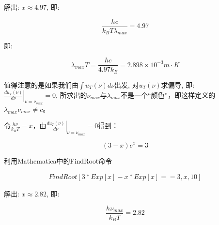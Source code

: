 \begin{enumerate}
解出: $x \approx 4.97$, 即:

\begin{equation}
\frac{hc}{k_B T \lambda_{max}} = 4.97~
\end{equation}

即:

\begin{equation}
    \lambda_{max} T =\frac{hc}{4.97 k_B} = 2.898 \times 10^{-3} m \cdot K~
\end{equation}

值得注意的是如果我们由$\int u_T(\nu) d \nu$出发, 对$u_T(\nu)$求偏导, 即: $\left.{ \frac{d u_T(\nu)}{d \nu}} \right|_{\nu = \nu_{max}}= 0$, 所求出的$\nu_{max}$与$\lambda_{max}$不是一个“颜色”，即这样定义的$\lambda_{max} \nu_{max} \neq c$。

令$\frac{h\nu}{k_BT} = x $，由$\left.{ \frac{d u_T(\nu)}{d \nu}} \right|_{\nu = \nu_{max}}= 0$得到：

\begin{equation}
    (3-x)e^x = 3~
\end{equation}

利用Mathematica中的FindRoot命令

\begin{align}
    FindRoot[3*Exp[x]-x*Exp[x]==3, {x,10}]~
\end{align}

解出: $x \approx 2.82 $, 即:


\begin{equation}
\frac{h\nu_{max}}{k_BT} = 2.82~
\end{equation}

\end{enumerate}
